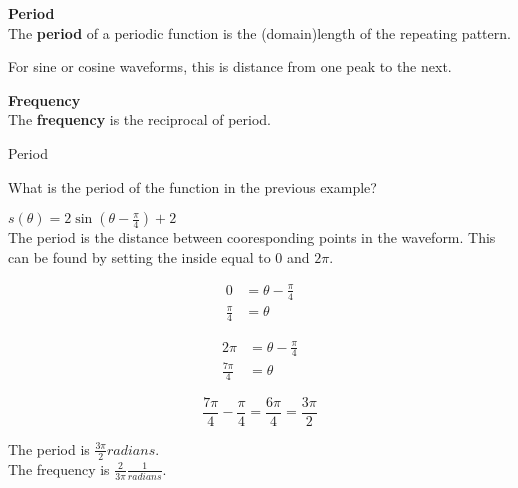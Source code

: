 \documentclass{ximera}
\begin{document}
\begin{definition} \textbf{\textcolor{green!50!black}{Period}} \\

The \textbf{period} of a periodic function is the (domain)length of the repeating pattern.


For sine or cosine waveforms, this is distance from one peak to the next.

\end{definition}

\begin{definition} \textbf{\textcolor{green!50!black}{Frequency}} \\

The \textbf{frequency} is the reciprocal of period.

\end{definition}














\begin{example}  Period

What is the period of the function in the previous example?



\begin{explanation}

$s(\theta) = 2 \sin\left(\theta - \frac{\pi}{4}\right) + 2$ \\


The period is the distance between cooresponding points in the waveform.  This can be found by setting the inside equal to $0$ and $2\pi$.

\begin{align*}
 0 & = \theta - \frac{\pi}{4} \\
 \frac{\pi}{4} & = \theta 
 \end{align*}

\begin{align*}
 2 \pi & = \theta - \frac{\pi}{4} \\
 \frac{7\pi}{4} & = \theta 
 \end{align*}

\[
\frac{7\pi}{4} - \frac{\pi}{4} = \frac{6\pi}{4} = \frac{3\pi}{2}
\]


\end{explanation}

The period is $\frac{3\pi}{2} radians$. \\

The frequency is $\frac{2}{3\pi} \tfrac{1}{radians}$. \\

\end{example}
\end{document}
